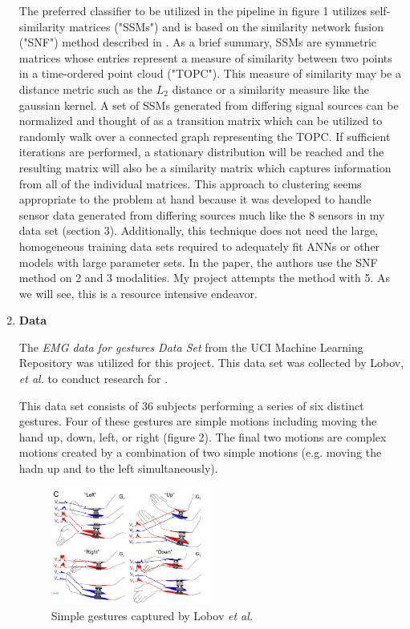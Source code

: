 \documentclass[11pt]{article}
\begin{document}
\begin{enumerate}
The preferred classifier to be utilized in the pipeline in figure 1 utilizes self-similarity matrices ("SSMs") and is based on the similarity network fusion ("SNF") method described in \cite{snf}. As a brief summary, SSMs are symmetric matrices whose entries represent a measure of similarity between two points in a time-ordered point cloud ("TOPC"). This measure of similarity may be a distance metric such as the $L_2$ distance or a similarity measure like the gaussian kernel. A set of SSMs generated from differing signal sources can be normalized and thought of as a transition matrix which can be utilized to randomly walk over a connected graph representing the TOPC. If sufficient iterations are performed, a stationary distribution will be reached and the resulting matrix will also be a similarity matrix which captures information from all of the individual matrices. This approach to clustering seems appropriate to the problem at hand because it was developed to handle sensor data generated from differing sources much like the 8 sensors in my data set (section 3). Additionally, this technique does not need the large, homogeneous training data sets required to adequately fit ANNs or other models with large parameter sets. In the paper, the authors use the SNF method on 2 and 3 modalities. My project attempts the method with 5. As we will see, this is a resource intensive endeavor.

\newpage

\item \textbf{Data}

The \emph{EMG data for gestures Data Set} from the UCI Machine Learning Repository \cite{uci} was utilized for this project. This data set was collected by Lobov, \emph{et al.} to conduct research for \cite{lobov}.

This data set consists of 36 subjects performing a series of six distinct gestures. Four of these gestures are simple motions including moving the hand up, down, left, or right (figure 2). The final two motions are complex motions created by a combination of two simple motions (e.g. moving the hadn up and to the left simultaneously).

\begin{figure}[h]
\centering
\includegraphics[width=0.5\textwidth]{gests}
\caption{Simple gestures captured by Lobov \emph{et al.} \cite{lobov}}
\end{figure}


\end{enumerate}
\end{document}

